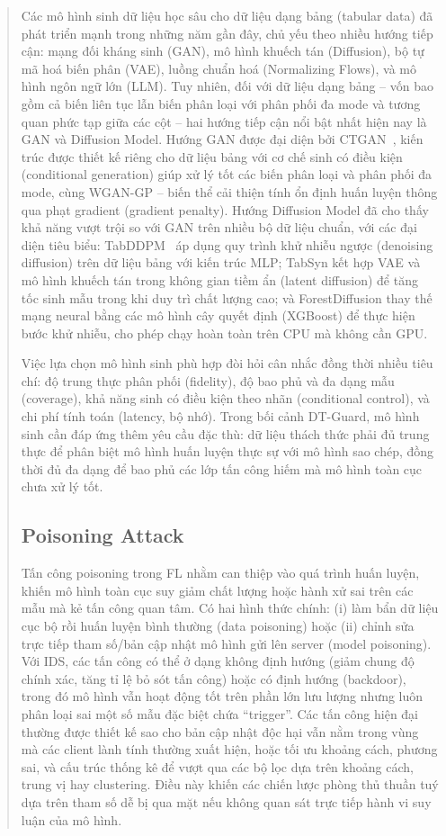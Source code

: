 \documentclass[runningheads]{llncs}
\begin{document}
\begin{abstract}
Các mô hình sinh dữ liệu học sâu cho dữ liệu dạng bảng (tabular data) đã phát triển mạnh trong những năm gần đây, chủ yếu theo nhiều hướng tiếp cận: mạng đối kháng sinh (GAN), mô hình khuếch tán (Diffusion), bộ tự mã hoá biến phân (VAE), luồng chuẩn hoá (Normalizing Flows), và mô hình ngôn ngữ lớn (LLM). Tuy nhiên, đối với dữ liệu dạng bảng -- vốn bao gồm cả biến liên tục lẫn biến phân loại với phân phối đa mode và tương quan phức tạp giữa các cột -- hai hướng tiếp cận nổi bật nhất hiện nay là GAN và Diffusion Model. Hướng GAN được đại diện bởi CTGAN~\cite{xu2019modeling}, kiến trúc được thiết kế riêng cho dữ liệu bảng với cơ chế sinh có điều kiện (conditional generation) giúp xử lý tốt các biến phân loại và phân phối đa mode, cùng WGAN-GP -- biến thể cải thiện tính ổn định huấn luyện thông qua phạt gradient (gradient penalty). Hướng Diffusion Model đã cho thấy khả năng vượt trội so với GAN trên nhiều bộ dữ liệu chuẩn, với các đại diện tiêu biểu: TabDDPM~\cite{kotelnikov2023tabddpm} áp dụng quy trình khử nhiễu ngược (denoising diffusion) trên dữ liệu bảng với kiến trúc MLP; TabSyn kết hợp VAE và mô hình khuếch tán trong không gian tiềm ẩn (latent diffusion) để tăng tốc sinh mẫu trong khi duy trì chất lượng cao; và ForestDiffusion thay thế mạng neural bằng các mô hình cây quyết định (XGBoost) để thực hiện bước khử nhiễu, cho phép chạy hoàn toàn trên CPU mà không cần GPU.

Việc lựa chọn mô hình sinh phù hợp đòi hỏi cân nhắc đồng thời nhiều tiêu chí: độ trung thực phân phối (fidelity), độ bao phủ và đa dạng mẫu (coverage), khả năng sinh có điều kiện theo nhãn (conditional control), và chi phí tính toán (latency, bộ nhớ). Trong bối cảnh DT-Guard, mô hình sinh cần đáp ứng thêm yêu cầu đặc thù: dữ liệu thách thức phải đủ trung thực để phân biệt mô hình huấn luyện thực sự với mô hình sao chép, đồng thời đủ đa dạng để bao phủ các lớp tấn công hiếm mà mô hình toàn cục chưa xử lý tốt.

\subsection{Poisoning Attack}

Tấn công poisoning trong FL nhằm can thiệp vào quá trình huấn luyện, khiến mô hình toàn cục suy giảm chất lượng hoặc hành xử sai trên các mẫu mà kẻ tấn công quan tâm. Có hai hình thức chính: (i) làm bẩn dữ liệu cục bộ rồi huấn luyện bình thường (data poisoning) hoặc (ii) chỉnh sửa trực tiếp tham số/bản cập nhật mô hình gửi lên server (model poisoning). Với IDS, các tấn công có thể ở dạng không định hướng (giảm chung độ chính xác, tăng tỉ lệ bỏ sót tấn công) hoặc có định hướng (backdoor), trong đó mô hình vẫn hoạt động tốt trên phần lớn lưu lượng nhưng luôn phân loại sai một số mẫu đặc biệt chứa ``trigger''. Các tấn công hiện đại thường được thiết kế sao cho bản cập nhật độc hại vẫn nằm trong vùng mà các client lành tính thường xuất hiện, hoặc tối ưu khoảng cách, phương sai, và cấu trúc thống kê để vượt qua các bộ lọc dựa trên khoảng cách, trung vị hay clustering. Điều này khiến các chiến lược phòng thủ thuần tuý dựa trên tham số dễ bị qua mặt nếu không quan sát trực tiếp hành vi suy luận của mô hình.


\end{abstract}
\end{document}
